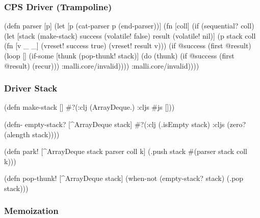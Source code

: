 \documentclass{beamer}
\begin{document}
\begin{frame}[fragile]
\frametitle{CPS Driver (Trampoline)}

{\scriptsize
\begin{semiverbatim}
(defn parser [p]
  (let [p (cat-parser p (end-parser))]
    (fn [coll]
      (if (sequential? coll)
        (let [stack (make-stack)
              success (volatile! false)
              result (volatile! nil)]
          (p stack coll (fn [v _ _]
                          (vreset! success true)
                          (vreset! result v)))
          (if @success
            (first @result)
            (loop []
              (if-some [thunk (pop-thunk! stack)]
                (do
                  (thunk)
                  (if @success
                    (first @result)
                    (recur)))
                :malli.core/invalid))))
        :malli.core/invalid))))
\end{semiverbatim}
}

\end{frame}


\begin{frame}[fragile]
\frametitle{Driver Stack}

\begin{semiverbatim}
(defn make-stack []
  #?(:clj (ArrayDeque.)
     :cljs #js []))

(defn- empty-stack? [^ArrayDeque stack]
  #?(:clj (.isEmpty stack)
     :cljs (zero? (alength stack))))

(defn park! [^ArrayDeque stack parser coll k]
  (.push stack #(parser stack coll k)))

(defn pop-thunk! [^ArrayDeque stack]
  (when-not (empty-stack? stack) (.pop stack)))
\end{semiverbatim}

\end{frame}


\begin{frame}
\frametitle{Memoization}
\end{frame}

\end{document}
